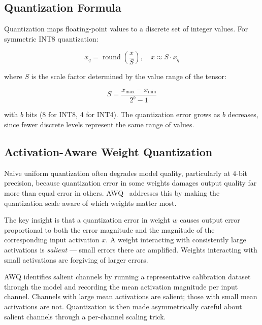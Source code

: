 \documentclass{book}
\begin{document}
\subsection{Quantization Formula}
\label{sec:quant_formula}

Quantization maps floating-point values to a discrete set of integer values.
For symmetric INT8 quantization:

\begin{equation}
\label{eq:quantize}
x_q = \operatorname{round}\!\left(\frac{x}{S}\right), \quad
x \approx S \cdot x_q
\end{equation}

where $S$ is the scale factor determined by the value range of the tensor:

\begin{equation}
\label{eq:scale}
S = \frac{x_{\max} - x_{\min}}{2^b - 1}
\end{equation}

with $b$ bits (8 for INT8, 4 for INT4). The quantization error grows as
$b$ decreases, since fewer discrete levels represent the same range of values.

\subsection{Activation-Aware Weight Quantization}
\label{sec:awq}

Naive uniform quantization often degrades model quality, particularly at
4-bit precision, because quantization error in some weights damages output
quality far more than equal error in others. AWQ~\cite{lin2023awq} addresses
this by making the quantization scale aware of which weights matter most.

The key insight is that a quantization error in weight $w$ causes output
error proportional to both the error magnitude and the magnitude of the
corresponding input activation $x$. A weight interacting with consistently
large activations is \emph{salient} --- small errors there are amplified.
Weights interacting with small activations are forgiving of larger errors.

AWQ identifies salient channels by running a representative calibration
dataset through the model and recording the mean activation magnitude per
input channel. Channels with large mean activations are salient; those
with small mean activations are not. Quantization is then made
asymmetrically careful about salient channels through a per-channel scaling
trick.
\end{document}
